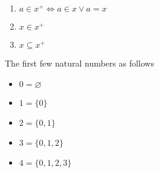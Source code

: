 \begin{proposition}{}{}
    \begin{enumerate}

        \item $a \in x^{+} \iff a \in x \lor a = x$
        \item $x \in x^{+}$
        \item $x \subseteq x^{+}$

    \end{enumerate}
\end{proposition}

\begin{example}
   The first few natural numbers as follows
   \begin{itemize}

       \item $0 = \varnothing$
       \item $1 = \{0\}$
       \item $2 = \{0,1\}$
       \item $3 = \{0,1,2\}$
       \item $4 = \{0,1,2,3\}$

   \end{itemize} 
\end{example}


